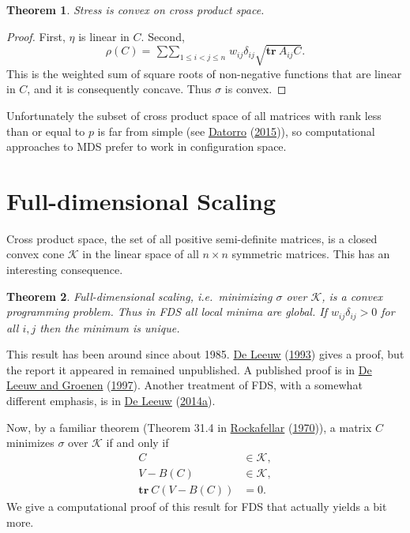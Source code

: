 \documentclass[
  12pt,
]{book}
\newtheorem{theorem}{Theorem}[chapter]
\theoremstyle{definition}
\theoremstyle{definition}
\theoremstyle{definition}
\theoremstyle{definition}
\theoremstyle{remark}
\begin{document}
\begin{theorem}
\protect\hypertarget{thm:unnamed-chunk-8}{}{\label{thm:unnamed-chunk-8} }Stress is convex on cross product space.
\end{theorem}

\begin{proof}
First, \(\eta\) is linear in \(C\). Second,
\[
\rho(C)=\mathop{\sum\sum}_{1\leq i<j\leq n} w_{ij}\delta_{ij}\sqrt{\mathbf{tr}\ A_{ij}C}.
\]
This is the weighted sum of square roots of non-negative functions that are linear in \(C\), and it is consequently concave. Thus \(\sigma\) is convex.
\end{proof}

Unfortunately the subset of cross product space of all matrices with rank less than or equal to \(p\) is far from simple (see \protect\hyperlink{ref-datorro_15}{Datorro} (\protect\hyperlink{ref-datorro_15}{2015})), so computational approaches to MDS prefer to work in configuration space.

\hypertarget{full-dimensional-scaling}{%
\section{Full-dimensional Scaling}\label{full-dimensional-scaling}}

Cross product space, the set of all positive semi-definite matrices, is a closed convex cone \(\mathcal{K}\) in the linear space of all \(n\times n\) symmetric matrices. This has an interesting consequence.

\begin{theorem}
\protect\hypertarget{thm:unnamed-chunk-9}{}{\label{thm:unnamed-chunk-9} }Full-dimensional scaling, i.e.~minimizing \(\sigma\) over \(\mathcal{K}\), is a convex programming problem. Thus in FDS all local minima are global. If \(w_{ij}\delta_{ij}>0\) for all \(i,j\) then the minimum is unique.
\end{theorem}

This result has been around since about 1985. \protect\hyperlink{ref-deleeuw_R_93c}{De Leeuw} (\protect\hyperlink{ref-deleeuw_R_93c}{1993}) gives a proof, but the report it appeared in remained unpublished. A published proof is in \protect\hyperlink{ref-deleeuw_groenen_A_97}{De Leeuw and Groenen} (\protect\hyperlink{ref-deleeuw_groenen_A_97}{1997}). Another treatment of FDS, with a somewhat different emphasis, is in \protect\hyperlink{ref-deleeuw_U_14b}{De Leeuw} (\protect\hyperlink{ref-deleeuw_U_14b}{2014a}).

Now, by a familiar theorem (Theorem 31.4 in \protect\hyperlink{ref-rockafellar_70}{Rockafellar} (\protect\hyperlink{ref-rockafellar_70}{1970})), a matrix \(C\) minimizes \(\sigma\) over \(\mathcal{K}\) if and only if
\begin{align}
C&\in\mathcal{K},\\
V-B(C)&\in\mathcal{K},\\
\mathbf{tr}\ C(V-B(C))&=0.
\end{align}
We give a computational proof of this result for FDS that actually yields a bit more.
\end{document}
